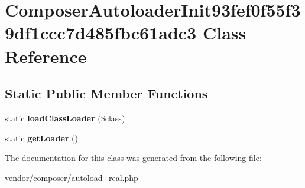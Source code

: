 \hypertarget{classComposerAutoloaderInit93fef0f55f39df1ccc7d485fbc61adc3}{}\section{Composer\+Autoloader\+Init93fef0f55f39df1ccc7d485fbc61adc3 Class Reference}
\label{classComposerAutoloaderInit93fef0f55f39df1ccc7d485fbc61adc3}
\subsection*{Static Public Member Functions}
\begin{DoxyCompactItemize}
\item 
static {\bfseries load\+Class\+Loader} (\$class)\hypertarget{classComposerAutoloaderInit93fef0f55f39df1ccc7d485fbc61adc3_a3db8ee452238cea1e80e23e0e6242548}{}\label{classComposerAutoloaderInit93fef0f55f39df1ccc7d485fbc61adc3_a3db8ee452238cea1e80e23e0e6242548}

\item 
static {\bfseries get\+Loader} ()\hypertarget{classComposerAutoloaderInit93fef0f55f39df1ccc7d485fbc61adc3_af3c98bf2c4aec2370330069d32a4898d}{}\label{classComposerAutoloaderInit93fef0f55f39df1ccc7d485fbc61adc3_af3c98bf2c4aec2370330069d32a4898d}

\end{DoxyCompactItemize}


The documentation for this class was generated from the following file\+:\begin{DoxyCompactItemize}
\item 
vendor/composer/autoload\+\_\+real.\+php\end{DoxyCompactItemize}
